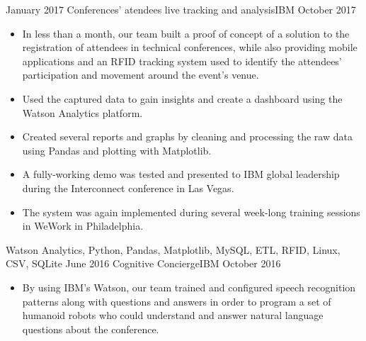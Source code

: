 %
%
%

\begin{projects}
  \project
    {January 2017} {Conferences' atendees live tracking and analysis}{IBM}
    {October 2017} {
                \begin{itemize}
                  \item In less than a month, our team built a proof of concept 
                  of a solution to the registration of attendees in technical 
                  conferences, while also providing mobile applications and an 
                  RFID tracking system used to identify the attendees' 
                  participation and movement around the event's venue.
                  \item Used the captured data to gain insights and create a 
                  dashboard using the Watson Analytics platform.
                  \item Created several reports and graphs by cleaning and 
                  processing the raw data using Pandas and plotting with 
                  Matplotlib.
                  \item A fully-working demo was tested and presented to IBM 
                  global leadership during the Interconnect conference in Las 
                  Vegas.
                  \item The system was again implemented during several 
                  week-long training sessions in WeWork in Philadelphia.
                \end{itemize}
              }
              {Watson Analytics, Python, Pandas, Matplotlib, MySQL, ETL, RFID, 
              Linux, CSV, SQLite}
  \emptySeparator
  \project
    {June 2016} {Cognitive Concierge}{IBM}
    {October 2016}    {
                      \begin{itemize}
                        \item By using IBM's Watson, our team trained and 
                        configured speech recognition patterns along with 
                        questions and answers in order to program a set of 
                        humanoid robots who could understand and answer natural 
                        language questions about the conference.

\end{itemize}}
\end{projects}
